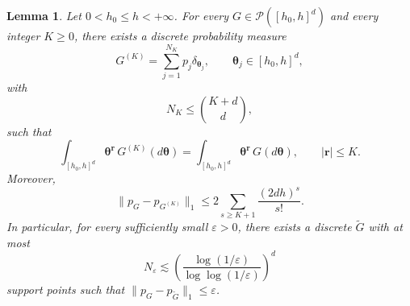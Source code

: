 \documentclass[twoside,12pt]{article}
\newtheorem{lem}[thm]{Lemma}
\begin{document}
\begin{lem}\label{lem:Poisson_moment_matching_d}
Let $0<h_0\le h<+\infty$. For every $G\in\mathcal P([h_0,h]^d)$ and every integer $K\ge 0$, there exists a discrete probability measure 
\begin{displaymath}
G^{(K)} = \sum_{j=1}^{N_K}p_j\delta_{\boldsymbol\theta_j}, \qquad \boldsymbol\theta_j\in[h_0,h]^d, 
\end{displaymath}
with
\begin{displaymath}
N_K\le \binom{K+d}{d},
\end{displaymath}
such that
\begin{displaymath}
\int_{[h_0,h]^d}\boldsymbol\theta^{\boldsymbol r}\, G^{(K)}(d\boldsymbol\theta) = \int_{[h_0,h]^d}\boldsymbol\theta^{\boldsymbol r}\, G(d\boldsymbol\theta), \qquad |\boldsymbol r|\le K.
\end{displaymath}
Moreover, 
\begin{displaymath}
\|p_G-p_{G^{(K)}}\|_1 \le 2\sum_{s\ge K+1}\frac{(2dh)^s}{s!}.
\end{displaymath}
In particular, for every sufficiently small $\varepsilon>0$, there exists a discrete $\tilde G$ with at most 
\begin{displaymath}
N_\varepsilon \lesssim \left( \frac{\log(1/\varepsilon)}{\log\log(1/\varepsilon)} \right)^d
\end{displaymath}
support points such that $\|p_G-p_{\tilde G}\|_1\le\varepsilon$.
\end{lem}
\end{document}
